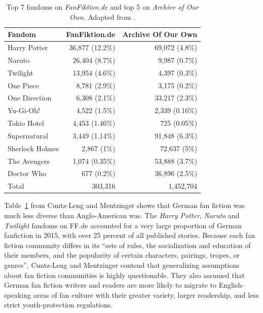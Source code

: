 \begin{table}[ht]
    \centering
    \begin{tabular}{lrr}
        \toprule
        \textbf{Fandom} & \textbf{FanFiktion.de} & \textbf{Archive Of Our Own} \\
        \midrule
        Harry Potter    & 36,877 (12.2\%)        & 69,072 (4.8\%)              \\
        Naruto          & 26,404 (8.7\%)         & 9,987 (0.7\%)               \\
        Twilight        & 13,954 (4.6\%)         & 4,397 (0.3\%)               \\
        One Piece       & 8,781 (2.9\%)          & 3,175 (0.2\%)               \\
        One Direction   & 6,308 (2.1\%)          & 33,217 (2.3\%)              \\
        Yu-Gi-Oh!       & 4,522 (1.5\%)          & 2,339 (0.16\%)              \\
        Tokio Hotel     & 4,453 (1.46\%)         & 725 (0.05\%)                \\
        Supernatural    & 3,449 (1.14\%)         & 91,848 (6.3\%)              \\
        Sherlock Holmes & 2,867 (1\%)            & 72,637 (5\%)                \\
        The Avengers    & 1,074 (0.35\%)         & 53,888 (3.7\%)              \\
        Doctor Who      & 677 (0.2\%)            & 36,896 (2.5\%)              \\
        \midrule
        Total           & 303,316                & 1,452,704                   \\
        \bottomrule
    \end{tabular}
    \caption[Top 7 fandoms on \emph{FanFiktion.de} and top 5 on \emph{Archive of Our Own}.]{Top 7 fandoms on \emph{FanFiktion.de} and top 5 on \emph{Archive of Our Own}.
    Adapted from \citet[Table~1]{Cuntz-Leng2015AGermany}.}
    \label{tab:cuntz_2015_german_english_ff_comparison}
\end{table}
Table~\ref{tab:cuntz_2015_german_english_ff_comparison} from Cuntz-Leng and Mentzinger shows that German fan fiction was much less diverse than Anglo-American was.
The \emph{Harry Potter}, \emph{Naruto} and \emph{Twilight} fandoms on FF.de accounted for a very large proportion of German fanfiction in 2015, with over 25 percent of all published stories.
Because each fan fiction community differs in its ``sets of rules, the socialization and education of their members, and the popularity of certain characters, pairings, tropes, or genres'', Cuntz-Leng and Mentzinger contend that generalizing assumptions about fan fiction communities is highly questionable.
They also assumed that German fan fiction writers and readers are more likely to migrate to English-speaking areas of fan culture with their greater variety, larger readership, and less strict youth-protection regulations.

